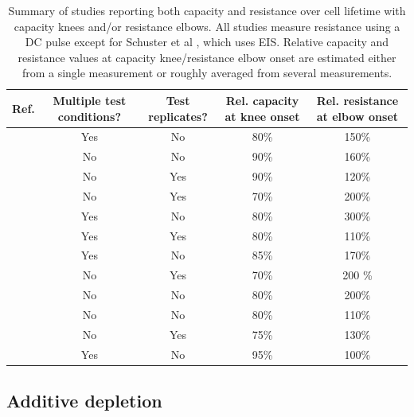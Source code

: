 \documentclass{article}
\begin{document}
\begin{table}[!h]
    \centering
    \begin{tabular}{||c||c|c|c|c||}
        \hline
        Ref. & Multiple test conditions? & Test replicates? & Rel. capacity at knee onset & Rel. resistance at elbow onset \\
        \hline
        \cite{ecker_calendar_2014} & Yes & No & 80\% & 150\% \\
        \cite{rahe_nanoscale_2019} & No & No & 90\% & 160\% \\
        \cite{willenberg_development_2020} & No & Yes & 90\% & 120\% \\
        \cite{broussely_main_2005} & No & Yes & 70\% & 200\% \\
        \cite{schuster_nonlinear_2015} & Yes & No & 80\% & 300\% \\
        \cite{lewerenz_systematic_2017, lewerenz_post-mortem_2017} & Yes & Yes & 80\% & 110\% \\
        \cite{martinez-laserna_technical_2018} & Yes & No &  85\% & 170\% \\
        \cite{braco_experimental_2020} & No & Yes & 70\% & 200 \% \\
        \cite{frisco_understanding_2016} & No & No & 80\% & 200\% \\
        \cite{klett_non-uniform_2014} & No & No & 80\% & 110\% \\
        \cite{pfrang_long-term_2018} & No & Yes & 75\% & 130\% \\
        \cite{wunsch_investigation_2019} & Yes & No & 95\% & 100\% \\
        \hline
    \end{tabular}
    \caption{Summary of studies reporting both capacity and resistance over cell lifetime with capacity knees and/or resistance elbows. All studies measure resistance using a DC pulse except for Schuster et al \cite{schuster_nonlinear_2015}, which uses EIS. Relative capacity and resistance values at capacity knee/resistance elbow onset are estimated either from a single measurement or roughly averaged from several measurements.}
    \label{tab:dcr_growth_papers}
\end{table}



\subsection{Additive depletion}
\end{document}
